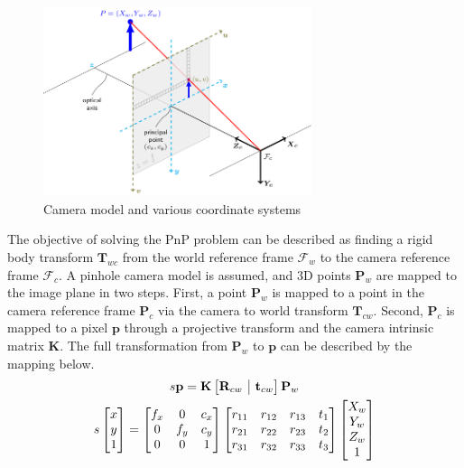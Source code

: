 \documentclass{article}
\makeatletter
\newcommand{\onebytwo}[2]{\ensuremath{\left[\begin{array}{@{}c|c@{}} #1 & #2 \end{array}\right]}}
\makeatother
\begin{document}
\begin{figure}
    \centering
    \includegraphics[width=0.7\textwidth]{figures/pinhole_camera_model.png}
    \caption{Camera model and various coordinate systems~\cite{opencv_calib3d}}
\end{figure}

The objective of solving the PnP problem can be described as finding a rigid body transform $\mathbf{T}_{wc}$ from the world reference frame $\mathcal{F}_w$ to the camera reference frame $\mathcal{F}_c$. A pinhole camera model is assumed, and 3D points $\mathbf{P}_w$ are mapped to the image plane in two steps. First, a point $\mathbf{P}_w$ is mapped to a point in the camera reference frame $\mathbf{P}_c$ via the camera to world transform $\mathbf{T}_{cw}$. Second, $\mathbf{P}_c$ is mapped to a pixel $\mathbf{p}$ through a projective transform and the camera intrinsic matrix $\mathbf{K}$. The full transformation from $\mathbf{P}_w$ to $\mathbf{p}$ can be described by the mapping below.
\begin{gather*}
    s\mathbf{p}=\mathbf{K} \onebytwo{\mathbf{R}_{cw}}{\mathbf{t}_{cw}}\mathbf{P}_w \\
    s \begin{bmatrix}x \\ y \\ 1\end{bmatrix} = \begin{bmatrix}f_x & 0 & c_x \\ 0 & f_y & c_y \\ 0 & 0 & 1\end{bmatrix} \begin{bmatrix} r_{11} & r_{12} &  r_{13} & t_{1} \\ r_{21} & r_{22} &  r_{23} & t_{2} \\ r_{31} & r_{32} &  r_{33} & t_{3} \end{bmatrix} \begin{bmatrix} X_w \\ Y_w \\ Z_w \\ 1 \end{bmatrix}
\end{gather*}
\end{document}
